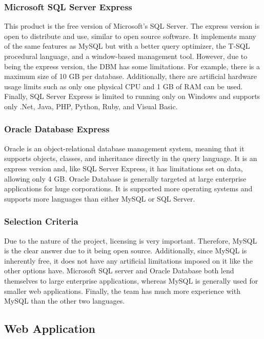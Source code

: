 \documentclass[10pt, onecolumn, twoside, peerreview]{IEEEtran}
\begin{document}
\subsubsection{Microsoft SQL Server Express}
This product is the free version of Microsoft's SQL Server. The express version is open to distribute and use, similar
to open source software. It implements many of the same features as MySQL but with a better query optimizer, the T-SQL
procedural language, and a window-based management tool. However, due to being the express version, the DBM has some
limitations. For example, there is a maximum size of 10 GB per database. Additionally, there are artificial hardware
usage limits such as only one physical CPU and 1 GB of RAM can be used. Finally, SQL Server Express is limited to
running only on Windows and supports only .Net, Java, PHP, Python, Ruby, and Visual Basic.\\

\subsubsection{Oracle Database Express}
Oracle is an object-relational database management system, meaning that it supports objects, classes, and inheritance
directly in the query language. It is an express version and, like SQL Server Express, it has limitations set on data,
allowing only 4 GB. Oracle Database is generally targeted at large enterprise applications for huge corporations. It is
supported more operating systems and supports more languages than either MySQL or SQL Server.\\

\subsubsection{Selection Criteria}
Due to the nature of the project, licensing is very important. Therefore, MySQL is the clear answer due to it being
open source. Additionally, since MySQL is inherently free, it does not have any artificial limitations imposed on it
like the other options have. Microsoft SQL server and Oracle Database both lend themselves to large enterprise
applications, whereas MySQL is generally used for smaller web applications. Finally, the team has much more experience
with MySQL than the other two languages.

\subsection{Web Application}
\end{document}
